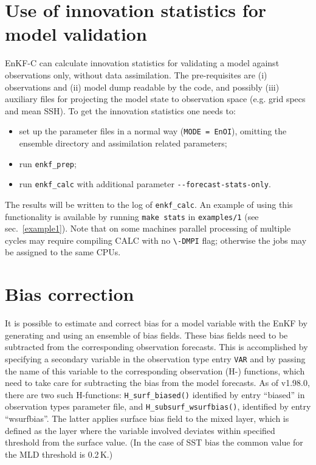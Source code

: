 \documentclass[11pt]{report}
\begin{document}
\section{Use of innovation statistics for model validation}

EnKF-C can calculate innovation statistics for validating a model against observations only, without data assimilation.
The pre-requisites are (i) observations and (ii) model dump readable by the code, and possibly (iii) auxiliary files for projecting the model state to observation space (e.g. grid specs and mean SSH).
To get the innovation statistics one needs to:
\begin{itemize}
\item set up the parameter files in a normal way (\verb|MODE = EnOI|), omitting the ensemble directory and assimilation related parameters;
\item run \verb|enkf_prep|;
\item run \verb|enkf_calc| with additional parameter \verb|--forecast-stats-only|.
\end{itemize}
The results will be written to the log of \verb|enkf_calc|. 
An example of using this functionality is available by running \verb|make stats| in \verb|examples/1| (see sec.~\ref{example1}).
Note that on some machines parallel processing of multiple cycles may require compiling CALC with no \verb|\-DMPI| flag; otherwise the jobs may be assigned to the same CPUs.

\section{Bias correction}
\label{sec:bias}

It is possible to estimate and correct bias for a model variable with the EnKF by generating and using an ensemble of bias fields.
These bias fields need to be subtracted from the corresponding observation forecasts.
This is accomplished by specifying a secondary variable in the observation type entry \verb|VAR| and by passing the name of this variable to the corresponding observation (H-) functions, which need to take care for subtracting the bias from the model forecasts.
As of v1.98.0, there are two such H-functions: \verb|H_surf_biased()| identified by entry ``biased'' in observation types parameter file, and \verb|H_subsurf_wsurfbias()|, identified by entry ``wsurfbias''.
The latter applies surface bias field to the mixed layer, which is defined as the layer where the variable involved deviates within specified threshold from the surface value.
(In the case of SST bias the common value for the MLD threshold is 0.2\,K.)
\end{document}
